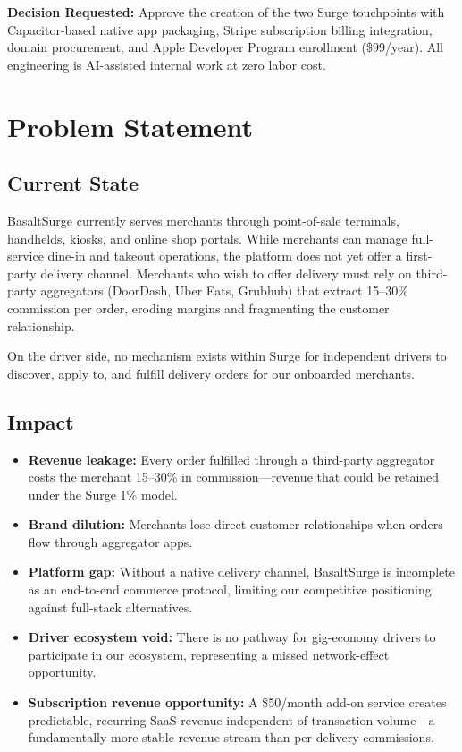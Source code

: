 \documentclass[11pt, letterpaper]{article}
\begin{document}
\begin{actionbox}
\textbf{Decision Requested:} Approve the creation of the two Surge touchpoints with Capacitor-based native app packaging, Stripe subscription billing integration, domain procurement, and Apple Developer Program enrollment (\$99/year). All engineering is AI-assisted internal work at zero labor cost.
\end{actionbox}

\section{Problem Statement}

\subsection{Current State}
BasaltSurge currently serves merchants through point-of-sale terminals, handhelds, kiosks, and online shop portals. While merchants can manage full-service dine-in and takeout operations, the platform does not yet offer a first-party delivery channel. Merchants who wish to offer delivery must rely on third-party aggregators (DoorDash, Uber Eats, Grubhub) that extract 15--30\% commission per order, eroding margins and fragmenting the customer relationship.

On the driver side, no mechanism exists within Surge for independent drivers to discover, apply to, and fulfill delivery orders for our onboarded merchants.

\subsection{Impact}
\begin{itemize}
    \item \textbf{Revenue leakage:} Every order fulfilled through a third-party aggregator costs the merchant 15--30\% in commission---revenue that could be retained under the Surge 1\% model.
    \item \textbf{Brand dilution:} Merchants lose direct customer relationships when orders flow through aggregator apps.
    \item \textbf{Platform gap:} Without a native delivery channel, BasaltSurge is incomplete as an end-to-end commerce protocol, limiting our competitive positioning against full-stack alternatives.
    \item \textbf{Driver ecosystem void:} There is no pathway for gig-economy drivers to participate in our ecosystem, representing a missed network-effect opportunity.
    \item \textbf{Subscription revenue opportunity:} A \$50/month add-on service creates predictable, recurring SaaS revenue independent of transaction volume---a fundamentally more stable revenue stream than per-delivery commissions.
\end{itemize}
\end{document}
